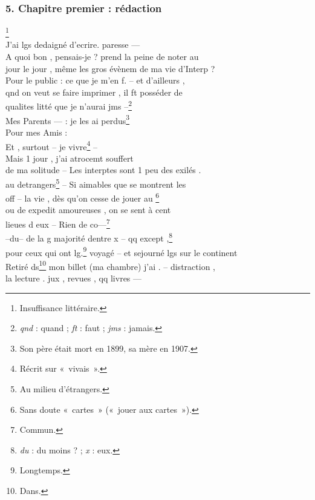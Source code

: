 \subsubsection*{5. Chapitre premier : rédaction}

\begin{LJlettre}
\noindent{} \hfill {}\footnote{Insuffisance littéraire.}\\
J'ai lgs dedaigné d'ecrire.  paresse —\\
A quoi bon , pensais-je ? prend la peine de noter au\\
jour le jour , même les gros évènem de ma vie d'Interp ?\\
Pour le public : ce que je m'en f. – et d'ailleurs ,\\
qnd on veut se faire imprimer , il ft posséder de\\
qualites litté que je n'aurai jms –\footnote{\textit{qnd} : quand ; \textit{ft} : faut ; \textit{jms} : jamais.}\\
 Mes Parents — : je les ai perdus\footnote{Son père était mort en 1899, sa mère en 1907.}\\
Pour mes Amis :\\
Et , surtout – je  vivre\footnote{Récrit sur «~vivais~».} –\\
Mais  1 jour , j'ai atrocemt souffert\\
de ma solitude – Les interptes sont 1 peu des exilés .\\
au  detrangers\footnote{Au milieu d'étrangers.} – Si aimables que se montrent les\\
off –  la vie , dès qu'on cesse de jouer au \footnote{Sans doute «~cartes~» («~jouer aux cartes~»).}\\
ou de  expedit amoureuses , on se sent à cent\\
lieues d eux – Rien de co—\footnote{Commun.}\\
–du– de la g majorité dentre x – qq except ,\footnote{\textit{du} : du moins ? ; \textit{x} : eux.}\\
pour ceux qui ont lg.\footnote{Longtemps.} voyagé – et sejourné lgs sur le continent\\
Retiré ds\footnote{Dans.} mon billet (ma chambre) j'ai . – distraction ,\\
la lecture . jux , revues , qq livres —\\

\end{LJlettre}
